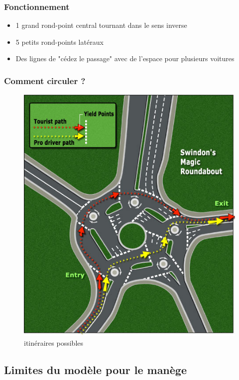 \documentclass[slidetop,11pt]{beamer}
\begin{document}
\begin{frame}
	\frametitle{Fonctionnement}
	\begin{itemize}
		\item 1 grand rond-point central tournant dans le sens inverse
		\item 5 petits rond-points latéraux
		\item Des lignes de "cédez le passage" avec de l'espace pour plusieurs voitures
	\end{itemize}
\end{frame}

\begin{frame}
	\frametitle{Comment circuler ?}
	\begin{figure}
		\begin{center}
			\includegraphics[scale=0.3]{./images/itin}
			\caption{itinéraires possibles}
		\end{center}
	\end{figure}
\end{frame}

	\subsection{Limites du modèle pour le manège}
	
\end{document}
